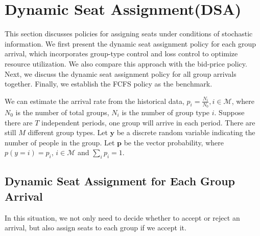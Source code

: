 
\section{Dynamic Seat Assignment(DSA)}
This section discusses policies for assigning seats under conditions of stochastic information. We first present the dynamic seat assignment policy for each group arrival, which incorporates group-type control and loss control to optimize resource utilization. We also compare this approach with the bid-price policy. Next, we discuss the dynamic seat assignment policy for all group arrivals together. Finally, we establish the FCFS policy as the benchmark.



We can estimate the arrival rate from the historical data, $p_i = \frac{N_{i}}{N_{0}}, i \in \mathcal{M}$, where $N_{0}$ is the number of total groups, $N_{i}$ is the number of group type $i$. Suppose there are $T$ independent periods, one group will arrive in each period. There are still $M$ different group types. Let $\mathbf{y}$ be a discrete random variable indicating the number of people in the group. Let $\mathbf{p}$ be the vector probability, where $p(y = i) = p_i$, $i \in \mathcal{M}$ and $\sum_{i} p_{i} =1$.







\subsection{Dynamic Seat Assignment for Each Group Arrival}
In this situation, we not only need to decide whether to accept or reject an arrival, but also assign seats to each group if we accept it.

